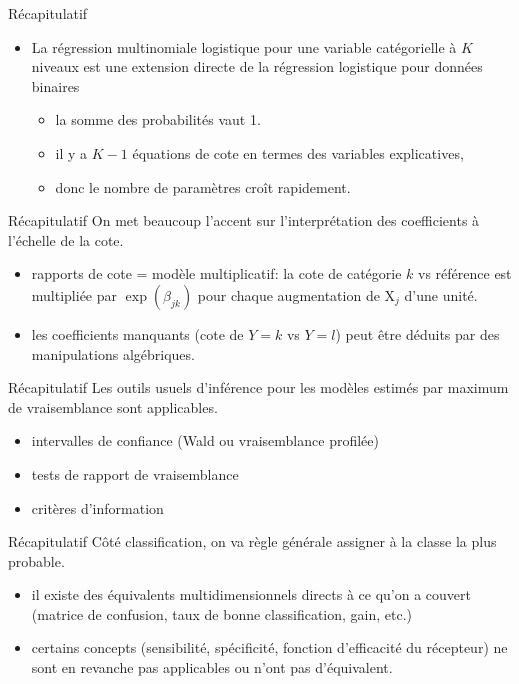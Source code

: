 \documentclass[
  ignorenonframetext,
]{beamer}
\providecommand{\tightlist}{%
  \setlength{\itemsep}{0pt}\setlength{\parskip}{0pt}}\usepackage{longtable,booktabs,array}
\begin{document}
\begin{frame}{Récapitulatif}
\label{ruxe9capitulatif-2}
\begin{itemize}
\tightlist
\item
  La régression multinomiale logistique pour une variable catégorielle à
  \(K\) niveaux est une extension directe de la régression logistique
  pour données binaires

  \begin{itemize}
  \tightlist
  \item
    la somme des probabilités vaut 1.
  \item
    il y a \(K-1\) équations de cote en termes des variables
    explicatives,
  \item
    donc le nombre de paramètres croît rapidement.
  \end{itemize}
\end{itemize}
\end{frame}

\begin{frame}{Récapitulatif}
\label{ruxe9capitulatif-3}
On met beaucoup l'accent sur l'interprétation des coefficients à
l'échelle de la cote.

\begin{itemize}
\tightlist
\item
  rapports de cote = modèle multiplicatif: la cote de catégorie \(k\) vs
  référence est multipliée par \(\exp(\beta_{jk})\) pour chaque
  augmentation de \(\mathrm{X}_j\) d'une unité.
\item
  les coefficients manquants (cote de \(Y=k\) vs \(Y=l\)) peut être
  déduits par des manipulations algébriques.
\end{itemize}
\end{frame}

\begin{frame}{Récapitulatif}
\label{ruxe9capitulatif-4}
Les outils usuels d'inférence pour les modèles estimés par maximum de
vraisemblance sont applicables.

\begin{itemize}
\tightlist
\item
  intervalles de confiance (Wald ou vraisemblance profilée)
\item
  tests de rapport de vraisemblance
\item
  critères d'information
\end{itemize}
\end{frame}

\begin{frame}{Récapitulatif}
\label{ruxe9capitulatif-5}
Côté classification, on va règle générale assigner à la classe la plus
probable.

\begin{itemize}
\tightlist
\item
  il existe des équivalents multidimensionnels directs à ce qu'on a
  couvert (matrice de confusion, taux de bonne classification, gain,
  etc.)
\item
  certains concepts (sensibilité, spécificité, fonction d'efficacité du
  récepteur) ne sont en revanche pas applicables ou n'ont pas
  d'équivalent.
\end{itemize}
\end{frame}
\end{document}
